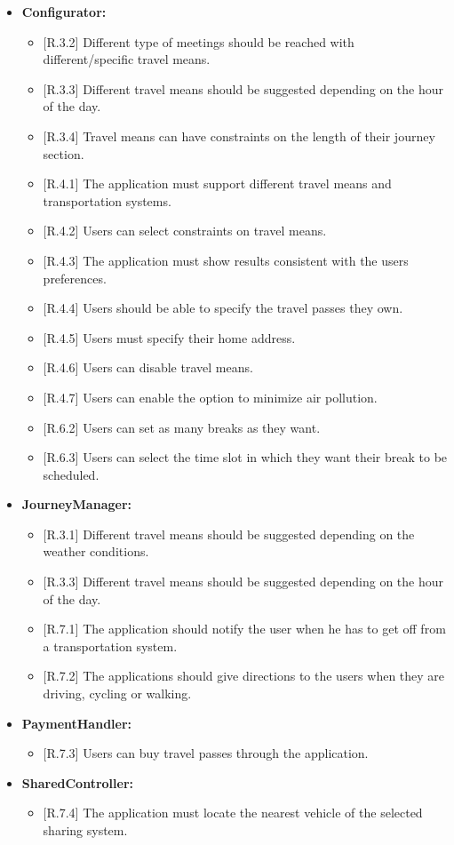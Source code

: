 \begin{itemize}
\item
\textbf{Configurator:}
\begin{itemize}
\item
$[$R.3.2$]$ Different type of meetings should be reached with different/specific travel means.
\item
$[$R.3.3$]$ Different travel means should be suggested depending on the hour of the day.
\item
$[$R.3.4$]$ Travel means can have constraints on the length of their journey section.
\item
$[$R.4.1$]$ The application must support different travel means and transportation systems.
\item
$[$R.4.2$]$ Users can select constraints on travel means.
\item
$[$R.4.3$]$ The application must show results consistent with the users preferences.
\item
$[$R.4.4$]$ Users should be able to specify the travel passes they own.
\item
$[$R.4.5$]$ Users must specify their home address.
\item
$[$R.4.6$]$ Users can disable travel means.
\item
$[$R.4.7$]$ Users can enable the option to minimize air pollution.
\item
$[$R.6.2$]$ Users can set as many breaks as they want.
\item
$[$R.6.3$]$ Users can select the time slot in which they want their break to be scheduled.
\end{itemize}

\item
\textbf{JourneyManager:}
\begin{itemize}
\item
$[$R.3.1$]$ Different travel means should be suggested depending on the weather conditions.
\item
$[$R.3.3$]$ Different travel means should be suggested depending on the hour of the day.
\item
$[$R.7.1$]$ The application should notify the user when he has to get off from a transportation system.
\item
$[$R.7.2$]$ The applications should give directions to the users when they are driving, cycling or walking.
\end{itemize}

\item
\textbf{PaymentHandler:}
\begin{itemize}
\item
$[$R.7.3$]$ Users can buy travel passes through the application.
\end{itemize}

\item
\textbf{SharedController:}
\begin{itemize}
\item
$[$R.7.4$]$ The application must locate the nearest vehicle of the selected sharing system.
\end{itemize}
\end{itemize}